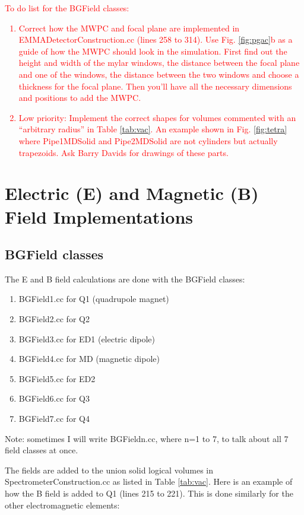 \documentclass[letter,11pt]{article}
\begin{document}
\textcolor{red}{To do list for the BGField classes:
\begin{enumerate}
\item Correct how the MWPC and focal plane are implemented in EMMADetectorConstruction.cc (lines 258 to 314). Use Fig. \ref{fig:pgac}b as a guide of how the MWPC should look in the simulation. First find out the height and width of the mylar windows, the distance between the focal plane and one of the windows, the distance between the two windows and choose a thickness for the focal plane. Then you'll have all the necessary dimensions and positions to add the MWPC.
\item Low priority: Implement the correct shapes for volumes commented with an ``arbitrary radius'' in Table \ref{tab:vac}. An example shown in Fig. \ref{fig:tetra} where Pipe1MDSolid and Pipe2MDSolid are not cylinders but actually trapezoids. Ask Barry Davids for drawings of these parts.
\end{enumerate}
}


\newpage
\section{Electric (E) and Magnetic (B) Field Implementations}

\subsection{BGField classes}

The E and B field calculations are done with the BGField classes:

\begin{enumerate}
\item BGField1.cc for Q1 (quadrupole magnet)
\item BGField2.cc for Q2
\item BGField3.cc for ED1 (electric dipole)
\item BGField4.cc for MD (magnetic dipole)
\item BGField5.cc for ED2
\item BGField6.cc for Q3
\item BGField7.cc for Q4
\end{enumerate}
Note: sometimes I will write BGFieldn.cc, where n=1 to 7, to talk about all 7 field classes at once.

The fields are added to the union solid logical volumes in SpectrometerConstruction.cc as listed in Table \ref{tab:vac}. Here is an example of how the B field is added to Q1 (lines 215 to 221). This is done similarly for the other electromagnetic elements:
\end{document}
